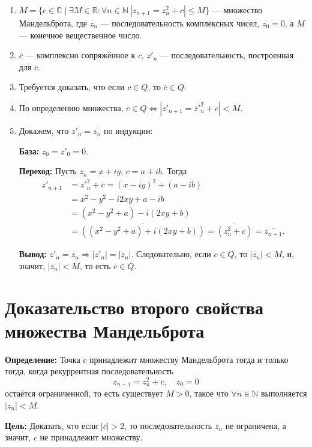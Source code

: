 \documentclass[a4paper,12pt]{article}
\begin{document}
\begin{enumerate}
    \item $M=\{c\in\mathbb{C} \mid \exists M\in\mathbb{R} : \forall n\in\mathbb{N} \ |z_{n+1}=z_{n}^{2}+c| \le M\}$ — множество Мандельброта, где $z_{n}$ — последовательность комплексных чисел, $z_{0}=0$, а $M$ — конечное вещественное число.
    \item $\overline{c}$ — комплексно сопряжённое к $c$, $z'_{n}$ — последовательность, построенная для $\overline{c}$.
    \item Требуется доказать, что если $c\in Q$, то $\overline{c}\in Q$.
    \item По определению множества, $\overline{c}\in Q \Leftrightarrow |z'_{n+1}=z'^{2}_{n}+\overline{c}|<M$.
    \item Докажем, что $z'_{n}=\overline{z_{n}}$ по индукции:
    
    \textbf{База:} $z_{0}=z'_{0}=0$. 
    
    \textbf{Переход:} Пусть $z_{n}=x+iy$, $c=a+ib$. Тогда
    \begin{align*}
        z'_{n+1} &= z'^{2}_{n}+\overline{c} = (x-iy)^{2}+(a-ib) \\
        &= x^{2}-y^{2}-i2xy+a-ib \\
        &= (x^{2}-y^{2}+a)-i(2xy+b) \\
        &= \overline{((x^{2}-y^{2}+a)+i(2xy+b))} = \overline{(z_{n}^{2}+c)} = \overline{z_{n+1}}.
    \end{align*}
    
    \textbf{Вывод:} $z'_{n}=\overline{z_{n}} \Rightarrow |z'_{n}|=|z_{n}|$. Следовательно, если $c\in Q$, то $|z_{n}|<M$, и, значит, $|\overline{z_{n}}|<M$, то есть $\overline{c}\in Q$.
\end{enumerate}

\clearpage

\hypertarget{sec:3}{}
\section{\textbf{Доказательство второго свойства множества Мандельброта}}

\textbf{Определение:} Точка $c$ принадлежит множеству Мандельброта тогда и только тогда, когда рекуррентная последовательность
$$
z_{n+1}=z_{n}^{2}+c, \quad z_{0}=0
$$
остаётся ограниченной, то есть существует $M>0$, такое что $\forall n \in \mathbb{N}$ выполняется $|z_{n}|<M$.

\textbf{Цель:} Доказать, что если $|c|>2$, то последовательность $z_{n}$ не ограничена, а значит, $c$ не принадлежит множеству.
\end{document}
